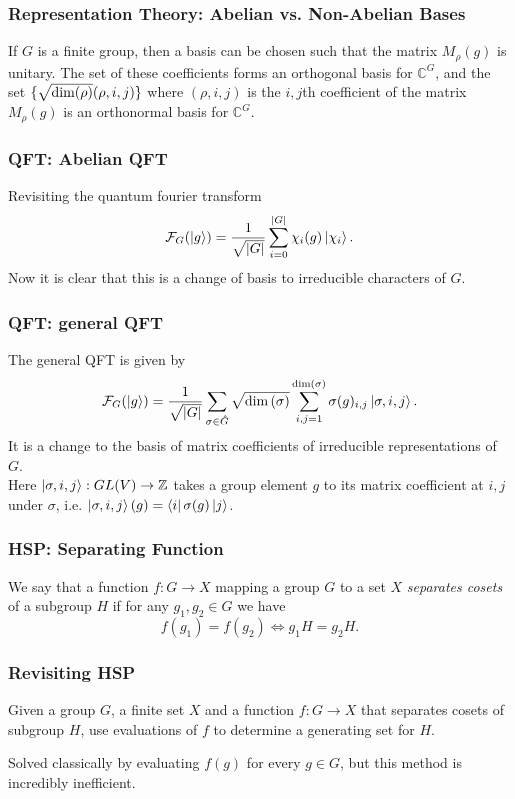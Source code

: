 \documentclass{beamer}
\renewcommand{\bra}{\Bra}
\renewcommand{\ket}{\Ket}
\newcommand{\abs}[1]{\left\lvert #1 \right\rvert}
\renewcommand{\dim}[1]{\textnormal{dim}\left(#1\right)}
\newcommand{\bb}[1]{\mathbb{#1}}
\renewcommand{\cal}[1]{\mathcal{#1}}
\begin{document}
\begin{frame}
\frametitle{Representation Theory: Abelian vs. Non-Abelian Bases}
        \begin{theorem}\label{thm:matrix_coefficients}
                If $G$ is a finite group, then a basis can be chosen such that the matrix $M_\rho(g)$ is unitary. The set of these coefficients forms an orthogonal basis for $\bb{C}^G$, and the set $\{\sqrt{\textnormal{dim}(\rho)} (\rho, i, j)\}$ where $(\rho, i, j)$ is the $i,j$th coefficient of the matrix $M_\rho(g)$ is an orthonormal basis for $\bb{C}^G$.
        \end{theorem}
\end{frame}

\begin{frame}
\frametitle{QFT: Abelian QFT}
        Revisiting the quantum fourier transform
                $$\cal{F}_G(\ket{g}) = \frac{1}{\sqrt{\abs{G}}} \sum_{i=0}^{\abs{G}} \chi_i(g) \ket{\chi_i}.$$
        Now it is clear that this is a change of basis to irreducible characters of $G$.
\end{frame}

\begin{frame}
\frametitle{QFT: general QFT}
    The general QFT is given by
        $$\cal{F}_G(\ket{g}) = \frac{1}{\sqrt{\abs{G}}} \sum_{\sigma \in \hat{G}} \sqrt{\dim{\sigma}} \sum_{i,j = 1}^{\dim{\sigma}} \sigma(g)_{i,j} \ket{\sigma, i, j}.$$
    It is a change to the basis of matrix coefficients of irreducible representations of $G$.\\
    Here $\ket{\sigma, i, j}: GL(V) \to \bb{Z}$ takes a group element $g$ to its matrix coefficient at $i, j$ under $\sigma$, i.e. $\ket{\sigma, i, j}(g) = \bra{i}\sigma(g) \ket{j}$.
\end{frame}

\begin{frame}
\frametitle{HSP: Separating Function}\label{sec:HSP}
    \begin{definition}\label{def:separating_function}
            We say that a function $f : G \to X$ mapping a group $G$ to a set $X$ \textit{separates cosets} of a subgroup $H$ if for any $g_1, g_2 \in G$ we have $$f(g_1) = f(g_2) \iff g_1 H = g_2 H.$$
        \end{definition}
\end{frame}

\begin{frame}
\frametitle{Revisiting HSP}
        \begin{problem}
            Given a group $G$, a finite set $X$ and a function $f: G \to X$ that separates cosets of subgroup $H$, use evaluations of $f$ to determine a generating set for $H$.
        \end{problem}
        Solved classically by evaluating $f(g)$ for every $g \in G$, but this method is incredibly inefficient.
\end{frame}
\end{document}
